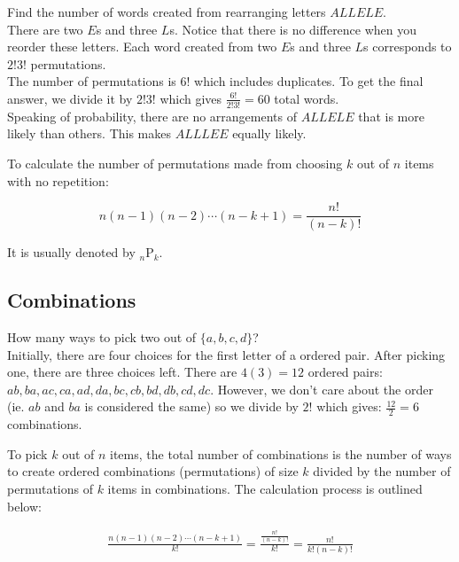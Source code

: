 \documentclass[12pt, a4paper]{article}
\newcounter{exa}
\begin{document}
\begin{texample}
Find the number of words created from rearranging letters $ALLELE$. \\

There are two $E$s and three $L$s. Notice that there is no difference when you reorder these letters. Each word created from two $E$s and three $L$s corresponds to $2!3!$ permutations. \\

The number of permutations is $6!$ which includes duplicates. To get the final answer, we divide it by $2!3!$ which gives $\frac{6!}{2!3!}=60$ total words. \\

Speaking of probability, there are no arrangements of $ALLELE$ that is more likely than others. This makes $ALLLEE$ equally likely.
\end{texample}

To calculate the number of permutations made from choosing $k$ out of $n$ items with no repetition:

$$n(n-1)(n-2) \cdots (n-k+1)=\frac{n!}{(n-k)!}$$

It is usually denoted by ${}_n \mathrm{P}_k$.

\subsection{Combinations}

\begin{texample}
How many ways to pick two out of $\{a, b, c, d\}$? \\

Initially, there are four choices for the first letter of a ordered pair. After picking one, there are three choices left. There are $4(3)=12$ ordered pairs: $ab, ba, ac, ca, ad, da, bc, cb, bd, db, cd, dc$. However, we don't care about the order (ie. $ab$ and $ba$ is considered the same) so we divide by $2!$ which gives: $\frac{12}{2}=6$ combinations.
\end{texample}

To pick $k$ out of $n$ items, the total number of combinations is the number of ways to create ordered combinations (permutations) of size $k$ divided by the number of permutations of $k$ items in combinations. The calculation process is outlined below:

\begin{align*}
\frac{n(n-1)(n-2) \cdots (n-k+1)}{k!} = \frac{\frac{n!}{(n-k)!}}{k!} = \frac{n!}{k!(n-k)!}
\end{align*}
\end{document}
